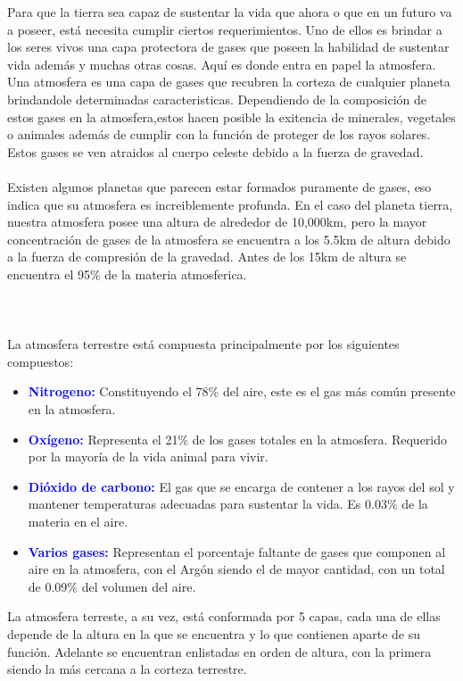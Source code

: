 \documentclass{article}
\begin{document}
Para que la tierra sea capaz de sustentar la vida que ahora o que en un futuro va a poseer, está necesita cumplir ciertos requerimientos. Uno de ellos es brindar a los seres vivos una capa protectora de gases que poseen la habilidad de sustentar vida además y muchas otras cosas. Aquí es donde entra en papel la atmosfera.
Una atmosfera es una capa de gases que recubren la corteza de cualquier planeta brindandole determinadas caracteristicas. Dependiendo de la composición de estos gases en la atmosfera,estos hacen posible la exitencia de minerales, vegetales o animales además de cumplir con la función de proteger de los rayos solares. Estos gases se ven atraidos al cuerpo celeste debido a la fuerza de gravedad.\\
\hfill 
\\Existen algunos planetas que parecen estar formados puramente de gases, eso indica que su atmosfera es increiblemente profunda. 
En el caso del planeta tierra, nuestra atmosfera posee una altura de alrededor de 10,000km, pero la mayor concentración de gases de la atmosfera se encuentra a los 5.5km de altura debido a la fuerza de compresión de la gravedad. Antes de los 15km de altura se encuentra el 95\% de la materia atmosferica.\\
\hfill \\
\hfill \\
\hfill \\ %


La atmosfera terrestre está compuesta principalmente por los siguientes compuestos:
\begin{itemize}
\item \textcolor{blue}{\textbf {Nitrogeno:}} Constituyendo el 78\% del aire, este es el gas más común presente en la atmosfera.
\item \textcolor{blue}{\textbf {Oxígeno:}} Representa el 21\% de los gases totales en la atmosfera. Requerido por la mayoría de la vida animal para vivir.
\item \textcolor{blue}{\textbf {Dióxido de carbono:}} El gas que se encarga de contener a los rayos del sol y mantener temperaturas adecuadas para sustentar la vida. Es 0.03\% de la materia en el aire.
\item  \textcolor{blue}{\textbf {Varios gases:}} Representan el porcentaje faltante de gases que componen al aire en la atmosfera, con el Argón siendo el de mayor cantidad, con un total de 0.09\% del volumen del aire.
\end{itemize}
La atmosfera terreste, a su vez, está conformada por 5 capas, cada una de ellas depende de la altura en la que se encuentra y lo que contienen aparte de su función. Adelante se encuentran enlistadas en orden de altura, con la primera siendo la más cercana a la corteza terrestre.\\
\end{document}
